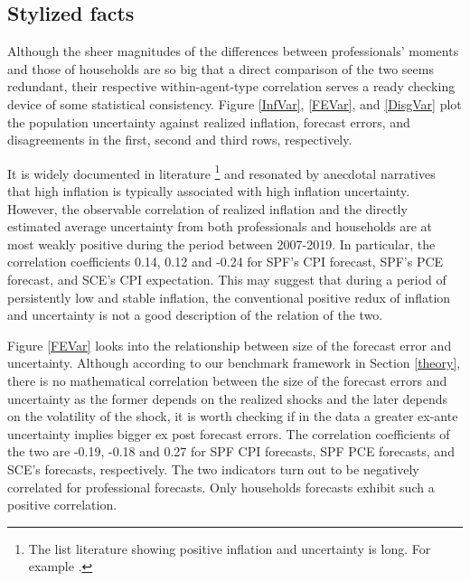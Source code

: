\documentclass[12pt]{article}
\begin{document}
	\subsection{Stylized facts}\label{StylizedFacts}
	
	Although the sheer magnitudes of the differences between professionals' moments and those of households are so big that a direct comparison of the two seems redundant, their respective within-agent-type correlation serves a ready checking device of some statistical consistency. Figure \ref{InfVar}, \ref{FEVar}, and \ref{DisgVar} plot the population uncertainty against realized inflation,  forecast errors, and disagreements in the first, second and third rows, respectively. 
	
	It is widely documented in literature \footnote{The list literature showing positive inflation and uncertainty is long. For example \citet{ball1990inflation}. } and resonated by anecdotal narratives that high inflation is typically associated with high inflation uncertainty. However, the observable correlation of realized inflation and the directly estimated average uncertainty from both professionals and households are at most weakly positive during the period between 2007-2019. In particular, the correlation coefficients  0.14, 0.12 and -0.24 for SPF's CPI forecast, SPF's PCE forecast, and SCE's CPI expectation. This may suggest that during a period of persistently low and stable inflation, the conventional positive redux of inflation and uncertainty is not a good description of the relation of the two. 
	
	Figure \ref{FEVar} looks into the relationship between size of the forecast error and uncertainty. Although according to our benchmark framework in Section \ref{theory}, there is no mathematical correlation between the size of the forecast errors and uncertainty as the former depends on the realized shocks and the later depends on the volatility of the shock, it is worth checking if in the data a greater ex-ante uncertainty implies bigger ex post forecast errors. The correlation coefficients of the two are -0.19, -0.18 and 0.27 for SPF CPI forecasts, SPF PCE forecasts, and SCE's forecasts, respectively. The two indicators turn out to be negatively correlated for professional forecasts. Only households forecasts exhibit such a positive correlation.   
	
\end{document}

